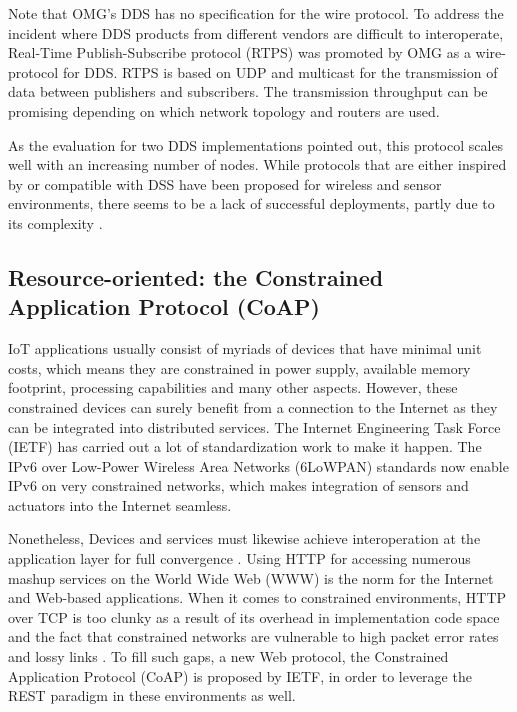 Note that OMG's DDS has no specification for the wire protocol. To address the incident where DDS products from different vendors are difficult to interoperate, Real-Time Publish-Subscribe protocol (RTPS) \cite{rtps} was promoted by OMG as a wire-protocol for DDS. RTPS is based on UDP and multicast for the transmission of data between publishers and subscribers. The transmission throughput can be promising depending on which network topology and routers are used.

As the evaluation \cite{4536566} for two DDS implementations pointed out, this protocol scales well with an increasing number of nodes. While protocols that are either inspired by or compatible with DSS have been proposed for wireless and sensor environments, there seems to be a lack of successful deployments, partly due to its complexity \cite{7396558}.

\subsection{Resource-oriented: the Constrained Application Protocol (CoAP)}

IoT applications usually consist of myriads of devices that have minimal unit costs, which means they are constrained in power supply, available memory footprint, processing capabilities and many other aspects. However, these constrained devices can surely benefit from a connection to the Internet as they can be integrated into distributed services. The Internet Engineering Task Force (IETF) has carried out a lot of standardization work to make it happen. The IPv6 over Low-Power Wireless Area Networks (6LoWPAN) standards \autocite{ipv6_rfc4944, ipv6_rfc6282} now enable IPv6 on very constrained networks, which makes integration of sensors and actuators into the Internet seamless. 

Nonetheless, Devices and services must likewise achieve interoperation at the application layer for full convergence \autocite{kovatsch2014californium}. Using HTTP for accessing numerous mashup services on the World Wide Web (WWW) is the norm for the Internet and Web-based applications. When it comes to constrained environments, HTTP over TCP is too clunky as a result of its overhead in implementation code space and the fact that constrained networks are vulnerable to high packet error rates and lossy links \autocite{6159216}. To fill such gaps, a new Web protocol, the Constrained Application Protocol (CoAP) is proposed by IETF, in order to leverage the REST paradigm in these environments as well. 

